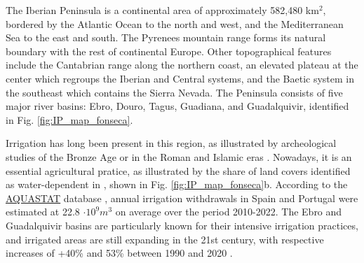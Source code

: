 The Iberian Peninsula is a continental area of approximately 582,480 km$^2$, bordered by the Atlantic Ocean to the north and west, and the Mediterranean Sea to the east and south. The Pyrenees mountain range forms its natural boundary with the rest of continental Europe. Other topographical features include the Cantabrian range along the northern coast, an elevated plateau at the center which regroups the Iberian and Central systems, and the Baetic system in the southeast which contains the Sierra Nevada.
The Peninsula consists of five major river basins: Ebro, Douro, Tagus, Guadiana, and Guadalquivir, identified in Fig. \ref{fig:IP_map_fonseca}.

Irrigation has long been present in this region, as illustrated by archeological studies of the Bronze Age \citep[2140-1500 BCE, ][]{mora-gonzalez_isotopic_2016} or in the Roman and Islamic eras \citep[250-800, ][]{butzer_irrigation_1985}. 
Nowadays, it is an essential agricultural pratice, as illustrated by the share of land covers identified as water-dependent in \citet{fonseca_agricultural_2022}, shown in Fig. \ref{fig:IP_map_fonseca}b. 
According to the \href{https://data.apps.fao.org/aquastat/?lang=en}{AQUASTAT} database \citep[presented in ][]{frenken_aquastat_2012}, annual irrigation withdrawals in Spain and Portugal were estimated at 22.8 $\cdot 10^{9} m^3$ on average over the period 2010-2022.
The Ebro and Guadalquivir basins are particularly known for their intensive irrigation practices, and irrigated areas are still expanding in the 21st century, with respective increases of +40\% and 53\% between 1990 and 2020 \citep{fonseca_agricultural_2022}. 

